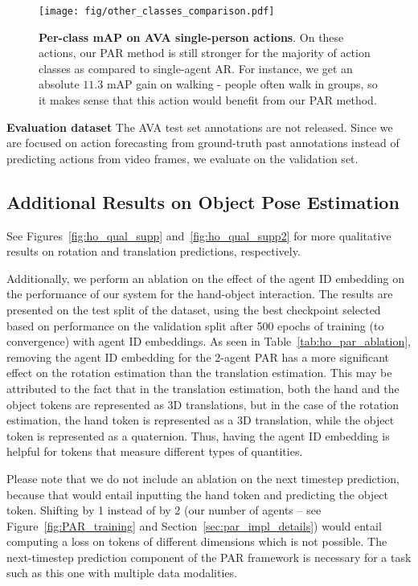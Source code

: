 \begin{figure*}
    \centering
    \texttt{[image: fig/other\_classes\_comparison.pdf]}
    \caption{\textbf{Per-class mAP on AVA single-person actions}. On these actions, our PAR method is still stronger for the majority of action classes as compared to single-agent AR. For instance, we get an absolute $11.3$ mAP gain on walking - people often walk in groups, so it makes sense that this action would benefit from our PAR method. }
\label{fig:ava_1_person_classes}
\end{figure*}


\medskip \noindent \textbf{Evaluation dataset} The AVA test set annotations are not released. Since we are focused on action forecasting from ground-truth past annotations instead of predicting actions from video frames, we evaluate on the validation set.

\subsection{Additional Results on Object Pose Estimation}\label{sec:app_ho_qual}

See Figures~\ref{fig:ho_qual_supp} and~\ref{fig:ho_qual_supp2} for more qualitative results on rotation and translation predictions, respectively. 

Additionally, we perform an ablation on the effect of the agent ID embedding on the performance of our system for the hand-object interaction. The results are presented on the test split of the dataset, using the best checkpoint selected based on performance on the validation split after 500 epochs of training (to convergence) with agent ID embeddings. As seen in Table~\ref{tab:ho_par_ablation}, removing the agent ID embedding for the 2-agent PAR has a more significant effect on the rotation estimation than the translation estimation. This may be attributed to the fact that in the translation estimation, both the hand and the object tokens are represented as 3D translations, but in the case of the rotation estimation, the hand token is represented as a 3D translation, while the object token is represented as a quaternion. Thus, having the agent ID embedding is helpful for tokens that measure different types of quantities. 

Please note that we do not include an ablation on the next timestep prediction, because that would entail inputting the hand token and predicting the object token. Shifting by 1 instead of by 2 (our number of agents -- see Figure~\ref{fig:PAR_training} and Section~\ref{sec:par_impl_details}) would entail computing a loss on tokens of different dimensions which is not possible. The next-timestep prediction component of the PAR framework is necessary for a task such as this one with multiple data modalities.

